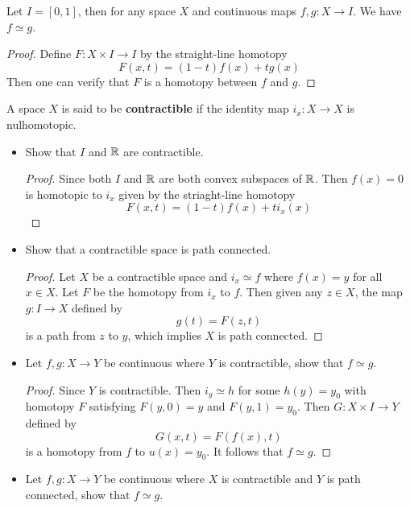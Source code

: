 \documentclass[12pt,a4paper]{article}
\begin{document}
    \begin{ex}
        Let $I=[0,1]$, then for any space $X$ and continuous maps $f,g:X\to I$. We have $f\simeq g$.
    \end{ex}
    \begin{proof}
        Define $F:X\times I\to I$ by the straight-line homotopy
        \[
            F(x,t)=(1-t)f(x)+tg(x)
        \]
        Then one can verify that $F$ is a homotopy between $f$ and $g$.
    \end{proof}
    \bigskip

    \begin{ex}
        A space $X$ is said to be \textbf{contractible} if the identity map $i_x:X\to X$ is nulhomotopic.
        \begin{itemize}
            \item Show that $I$ and $\mathbb{R}$ are contractible.
            \begin{proof}
                Since both $I$ and $\mathbb{R}$ are both convex subspaces of $\mathbb{R}$. Then $f(x)=0$ is homotopic to $i_x$ given by the striaght-line homotopy
                \[
                    F(x,t)=(1-t)f(x)+ti_x(x)
                \]
            \end{proof}
            \item Show that a contractible space is path connected.
            \begin{proof}
                Let $X$ be a contractible space and $i_x\simeq f$ where $f(x)=y$ for all $x\in X$. Let $F$ be the homotopy from $i_x$ to $f$. Then given any $z\in X$, the map $g:I\to X$ defined by
                \[
                    g(t)=F(z,t)
                \]
                is a path from $z$ to $y$, which implies $X$ is path connected.
            \end{proof}
            \item Let $f,g:X\to Y$ be continuous where $Y$ is contractible, show that $f\simeq g$.
            \begin{proof}
                Since $Y$ is contractible. Then $i_y\simeq h$ for some $h(y)=y_0$ with homotopy $F$ satisfying $F(y,0)=y$ and $F(y,1)=y_0$. Then $G:X\times I\to Y$ defined by
                \[
                    G(x,t)=F(f(x),t)
                \]
                is a homotopy from $f$ to $u(x)=y_0$. It follows that $f\simeq g$.
            \end{proof}
            \item Let $f,g:X\to Y$ be continuous where $X$ is contractible and $Y$ is path connected, show that $f\simeq g$.

\end{itemize}
\end{ex}
\end{document}
